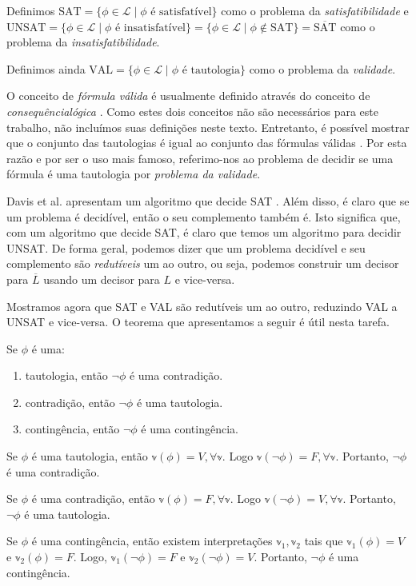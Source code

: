 \begin{definition}
	Definimos $\text{SAT} = \{\phi \in \mathcal{L} \mid \phi \text{ é satisfatível} \}$ como o problema da \emph{satisfatibilidade} e $\text{UNSAT} = \{\phi \in \mathcal{L} \mid \phi \text{ é insatisfatível} \} = \{\phi \in \mathcal{L} \mid \phi \notin \text{SAT} \} = \overline{\text{SAT}}$ como o problema da \emph{insatisfatibilidade}.
	
	Definimos ainda $\text{VAL} = \{\phi \in \mathcal{L} \mid \phi \text{ é tautologia} \}$ como o problema da \emph{validade}.
\end{definition}

O conceito de \emph{fórmula válida} é usualmente definido através do conceito de \emph{consequência\break lógica} \cite{kleene68book}. Como estes dois conceitos não são necessários para este trabalho, não incluímos suas definições neste texto. Entretanto, é possível mostrar que o conjunto das tautologias é igual ao conjunto das fórmulas válidas \cite{kleene68book}. Por esta razão e por ser o uso mais famoso, referimo-nos ao problema de decidir se uma fórmula é uma tautologia por \emph{problema da validade}.

Davis et al. apresentam um algoritmo que decide SAT \cite{davis1960computing}. Além disso, é claro que se um problema é decidível, então o seu complemento também é. Isto significa que, com um algoritmo que decide SAT, é claro que temos um algoritmo para decidir UNSAT. De forma geral, podemos dizer que um problema decidível e seu complemento são \emph{redutíveis} um ao outro, ou seja, podemos construir um decisor para $\overline{L}$ usando um decisor para $L$ e vice-versa.

Mostramos agora que SAT e VAL são redutíveis um ao outro, reduzindo VAL a UNSAT e vice-versa. O teorema que apresentamos a seguir é útil nesta tarefa.

\begin{theorem}
	\label{negacoes}
	Se $\phi$ é uma:
	\begin{enumerate}
		\item tautologia, então $\neg \phi$ é uma contradição.
		\item contradição, então $\neg \phi$ é uma tautologia.
		\item contingência, então $\neg \phi$ é uma contingência.
	\end{enumerate}
\end{theorem}

\begin{prova}
Se $\phi$ é uma tautologia, então $\mathbb{v}(\phi) = V, \forall \mathbb{v}$. Logo $\mathbb{v}(\neg \phi) = F, \forall \mathbb{v}$. Portanto, $\neg \phi$ é uma contradição.

Se $\phi$ é uma contradição, então $\mathbb{v}(\phi) = F, \forall \mathbb{v}$. Logo $\mathbb{v}(\neg \phi) = V, \forall \mathbb{v}$. Portanto, $\neg \phi$ é uma tautologia.

Se $\phi$ é uma contingência, então existem interpretações $\mathbb{v}_1,\mathbb{v}_2$ tais que $\mathbb{v}_1(\phi) = V$ e $\mathbb{v}_2(\phi) = F$. Logo, $\mathbb{v}_1(\neg \phi) = F$ e $\mathbb{v}_2(\neg \phi) = V$. Portanto, $\neg \phi$ é uma contingência.
\end{prova}

